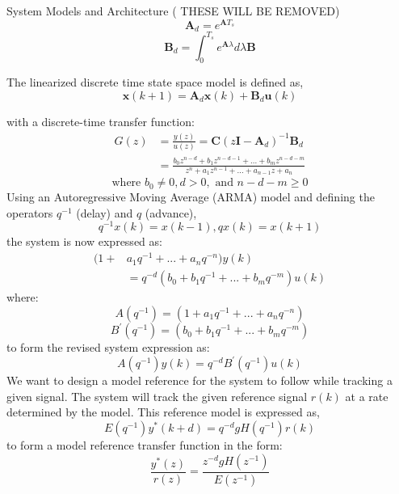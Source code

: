 \begin{section}{System Models and Architecture}
( THESE WILL BE REMOVED)
    \begin{equation}
	\bm{A}_d = e^{\bm{A}T_s}
	\end{equation}
    \begin{equation}
	\bm{B}_d = \int_0^{T_s} e^{\bm{A}\lambda}d\lambda \bm{B}
	\end{equation}

The linearized discrete time state space model is defined as,
    \begin{equation}
	\bm{x}(k+1) = \bm{A}_d\bm{x}(k) + \bm{B}_d\bm{u}(k)
	\end{equation}

with a discrete-time transfer function:
	\begin{align}
        G(z) & = \frac{y(z)}{u(z)} = \bm{C}(z\bm{I}-\bm{A}_d)^{-1}\bm{B}_d  \\
	& = \frac{b_0z^{n-d}+b_1z^{n-d-1} +...+b_mz^{n-d-m}}{z^{n}+a_1z^{n-1}+...+a_{n-1}z+a_n} \nonumber
	\end{align}
	\begin{equation}
	\text{where } b_0\ne{0}, d>0, \text{ and } n-d-m\geq{0} \nonumber
	\end{equation}
Using an Autoregressive Moving Average (ARMA) model and defining the operators $q^{-1}$ (delay) and $q$ (advance),
	\begin{equation}
	q^{-1}x(k) = x(k-1), qx(k) = x(k+1)
	\end{equation}
the system is now expressed as:
    \begin{align}
	(1+&a_1q^{-1}+...+a_nq^{-n})y(k) \nonumber \\
	&=q^{-d}(b_0+b_1q^{-1}+...+b_mq^{-m})u(k)
	\end{align}
where:
	\begin{equation}
	A(q^{-1})=(1+a_1q^{-1}+...+a_nq^{-n}) \nonumber
	\end{equation}
	\begin{equation}
	B^{'}(q^{-1})=(b_0+b_1q^{-1}+...+b_mq^{-m}) \nonumber
	\end{equation}
to form the revised system expression as:
	\begin{equation}
	A(q^{-1})y(k)=q^{-d}B^{'}(q^{-1})u(k)
	\end{equation}
We want to design a model reference for the system to follow while tracking a given signal. The system will track the given reference signal $r(k)$ at a rate determined by the model. This reference model is expressed as,
	\begin{equation}
	E(q^{-1})y^*(k+d)=q^{-d}gH(q^{-1})r(k)
	\end{equation}
to form a model reference transfer function in the form:
	\begin{equation}
	\frac{y^*(z)}{r(z)}=\frac{z^{-d}gH(z^{-1})}{E(z^{-1})}
	\end{equation}



\end{section}
